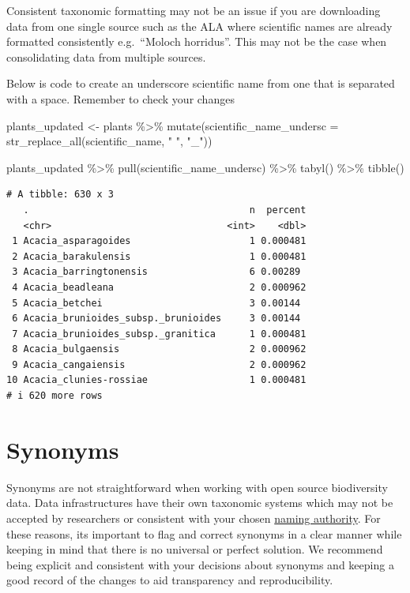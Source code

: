 \documentclass[
  letterpaper,
  DIV=11,
  numbers=noendperiod,
  oneside]{scrreprt}
\newenvironment{Shaded}{\begin{snugshade}}{\end{snugshade}}
\newcommand{\AttributeTok}[1]{\textcolor[rgb]{0.40,0.45,0.13}{#1}}
\newcommand{\FunctionTok}[1]{\textcolor[rgb]{0.28,0.35,0.67}{#1}}
\newcommand{\NormalTok}[1]{\textcolor[rgb]{0.00,0.23,0.31}{#1}}
\newcommand{\OtherTok}[1]{\textcolor[rgb]{0.00,0.23,0.31}{#1}}
\newcommand{\SpecialCharTok}[1]{\textcolor[rgb]{0.37,0.37,0.37}{#1}}
\newcommand{\StringTok}[1]{\textcolor[rgb]{0.13,0.47,0.30}{#1}}
\begin{document}
Consistent taxonomic formatting may not be an issue if you are
downloading data from one single source such as the ALA where scientific
names are already formatted consistently e.g.~``Moloch horridus''. This
may not be the case when consolidating data from multiple sources.

Below is code to create an underscore scientific name from one that is
separated with a space. Remember to check your changes

\begin{Shaded}
\begin{Highlighting}[]
\NormalTok{plants\_updated }\OtherTok{\textless{}{-}}\NormalTok{ plants }\SpecialCharTok{\%\textgreater{}\%} 
  \FunctionTok{mutate}\NormalTok{(}\AttributeTok{scientific\_name\_undersc =} \FunctionTok{str\_replace\_all}\NormalTok{(scientific\_name, }\StringTok{" "}\NormalTok{, }\StringTok{"\_"}\NormalTok{)) }

\NormalTok{plants\_updated }\SpecialCharTok{\%\textgreater{}\%} 
  \FunctionTok{pull}\NormalTok{(scientific\_name\_undersc) }\SpecialCharTok{\%\textgreater{}\%} 
  \FunctionTok{tabyl}\NormalTok{() }\SpecialCharTok{\%\textgreater{}\%} 
  \FunctionTok{tibble}\NormalTok{()}
\end{Highlighting}
\end{Shaded}

\begin{verbatim}
# A tibble: 630 x 3
   .                                       n  percent
   <chr>                               <int>    <dbl>
 1 Acacia_asparagoides                     1 0.000481
 2 Acacia_barakulensis                     1 0.000481
 3 Acacia_barringtonensis                  6 0.00289 
 4 Acacia_beadleana                        2 0.000962
 5 Acacia_betchei                          3 0.00144 
 6 Acacia_brunioides_subsp._brunioides     3 0.00144 
 7 Acacia_brunioides_subsp._granitica      1 0.000481
 8 Acacia_bulgaensis                       2 0.000962
 9 Acacia_cangaiensis                      2 0.000962
10 Acacia_clunies-rossiae                  1 0.000481
# i 620 more rows
\end{verbatim}

\hypertarget{synonyms}{%
\section{Synonyms}\label{synonyms}}

Synonyms are not straightforward when working with open source
biodiversity data. Data infrastructures have their own taxonomic systems
which may not be accepted by researchers or consistent with your chosen
\href{link_back}{naming authority}. For these reasons, its important to
flag and correct synonyms in a clear manner while keeping in mind that
there is no universal or perfect solution. We recommend being explicit
and consistent with your decisions about synonyms and keeping a good
record of the changes to aid transparency and reproducibility.
\end{document}
